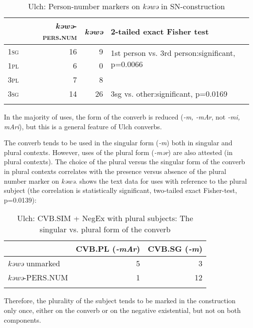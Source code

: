 \documentclass[output=paper]{langscibook}
\begin{document}
\begin{table}
    \caption{Ulch: Person-number markers on \textit{kəwə} in SN-construction}
    \label{tab:T6}
    \begin{tabular}{lrrl}
    \lsptoprule
     & \textit{kəwə}-\textsc{pers.num} & \textit{kəwə} & 2-tailed exact Fisher test \\
     \midrule
    \textsc{1sg} & 16 & 9 & \multirow{2}{*}{1st person vs. 3rd person:\newline significant, p=0.0066} \\
    \textsc{1pl} & 6 & 0 &  \\
    \textsc{3pl} & 7 & 8 &  \\
    \textsc{3sg} & 14 & 26 & 3sg vs. other:\newline significant, p=0.0169 \\ \lspbottomrule
    \end{tabular}
\end{table}

In the majority of uses, the form of the converb is reduced (\textit{-m, -mAr}, not \textit{-mi, mAri}), but this is a general feature of Ulch converbs.

The converb tends to be used in the singular form (\textit{-m}) both in singular and plural contexts. However, uses of the plural form (\textit{-mər}) are also attested (in plural contexts). The choice of the plural versus the singular form of the converb in plural contexts correlates with the presence versus absence of the plural number marker on \textit{kəwə}.  shows the text data for uses with reference to the plural subject (the correlation is statistically significant, two-tailed exact Fisher-test, p=0.0139):

\begin{table}
    \caption{Ulch: CVB.SIM + NegEx with plural subjects: The singular vs. plural form of the converb}
    \label{tab:T7}
    \begin{tabular}{lrr}
    \lsptoprule
     & CVB.PL (\textit{-mAr}) & CVB.SG (\textit{-m}) \\ \midrule
    \textit{kəwə} unmarked & 5 & 3 \\
    \textit{kəwə}-PERS.NUM & 1 & 12 \\ \lspbottomrule
    \end{tabular}
\end{table}

Therefore, the plurality of the subject tends to be marked in the construction only once, either on the converb or on the negative existential, but not on both components.
\end{document}
